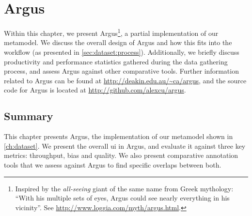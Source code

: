 \chapter{Argus}
\label{ch:argus}

Within this chapter, we present Argus\footnote{Inspired by the \textit{all-seeing} giant of the same name from Greek mythology: ``With his multiple sets of eyes, Argus could see nearly everything in his vicinity''. See \url{http://www.loggia.com/myth/argus.html}.}, a partial implementation of our metamodel. We discuss the overall design of Argus and how this fits into the workflow (as presented in \cref{sec:dataset:process}). Additionally, we briefly discuss productivity and performance statistics gathered during the data gathering process, and assess Argus against other comparative tools. Further information related to Argus can be found at \url{http://deakin.edu.au/~ca/argus}, and the source code for Argus is located at \url{http://github.com/alexcu/argus}.





\section*{Summary}

This chapter presents Argus, the implementation of our metamodel shown in \cref{ch:dataset}. We present the overall \gls{ui} in Argus, and evaluate it against three key metrics: throughput, bias and quality. We also present comparative annotation tools that we assess against Argus to find specific overlaps between both.
